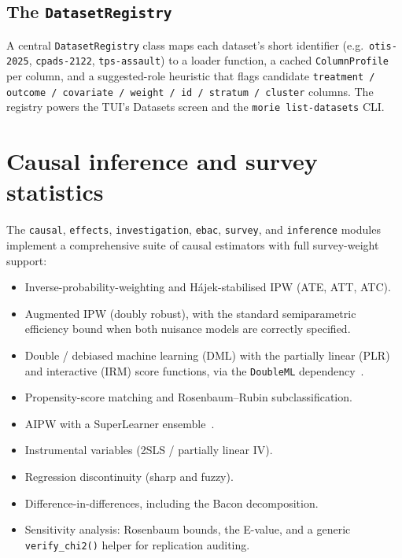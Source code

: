 \documentclass[11pt,a4paper]{article}
\theoremstyle{plain}
\theoremstyle{definition}
\theoremstyle{remark}
\begin{document}
\subsection{The \texttt{DatasetRegistry}}

A central \texttt{DatasetRegistry} class maps each dataset's
short identifier (e.g.\ \texttt{otis-2025}, \texttt{cpads-2122},
\texttt{tps-assault}) to a loader function, a cached
\texttt{ColumnProfile} per column, and a suggested-role
heuristic that flags candidate \texttt{treatment / outcome /
covariate / weight / id / stratum / cluster} columns. The
registry powers the TUI's Datasets screen and the \texttt{morie
list-datasets} CLI.

\section{Causal inference and survey statistics}
\label{sec:causal}

The \texttt{causal}, \texttt{effects}, \texttt{investigation},
\texttt{ebac}, \texttt{survey}, and \texttt{inference} modules
implement a comprehensive suite of causal estimators with full
survey-weight support:

\begin{itemize}
\item Inverse-probability-weighting and H\'ajek-stabilised IPW
      (ATE, ATT, ATC).
\item Augmented IPW (doubly robust), with the standard
      semiparametric efficiency bound when both nuisance models
      are correctly specified.
\item Double / debiased machine learning (DML) with the partially
      linear (PLR) and interactive (IRM) score functions, via the
      \texttt{DoubleML} dependency~\cite{Chernozhukov2018DoubleML}.
\item Propensity-score matching and Rosenbaum--Rubin
      subclassification.
\item AIPW with a SuperLearner ensemble~\cite{vanderLaan2007SuperLearner}.
\item Instrumental variables (2SLS / partially linear IV).
\item Regression discontinuity (sharp and fuzzy).
\item Difference-in-differences, including the Bacon decomposition.
\item Sensitivity analysis: Rosenbaum bounds, the E-value, and a
      generic \texttt{verify\_chi2()} helper for replication
      auditing.
\end{itemize}
\end{document}

